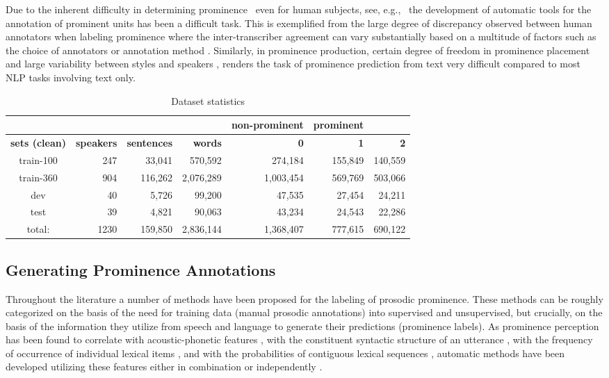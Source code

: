 \documentclass[11pt]{article}
\begin{document}
Due to the inherent difficulty in determining prominence \textemdash ~even for human subjects, see, e.g., \cite{yoon2004intertranscriber} \textemdash ~the development of automatic tools for the annotation of prominent units has been a difficult task. This is exemplified from the large degree of discrepancy observed between human annotators when labeling prominence where the inter-transcriber agreement can vary substantially based on a multitude of factors such as the choice of annotators or annotation method \cite{mo2008naive,yoon2004intertranscriber,kakouros20163pro}.
Similarly, in prominence production, certain degree of freedom in prominence placement and large variability between styles and speakers \cite{yuan2005pitch}, renders the task of prominence prediction from text very difficult compared to most NLP tasks involving text only.

\begin{table*}[ht!]
    \centering
\noindent\begin{tabular}{c|rrr|r|rr}\hline
& & & & \bf non-prominent & \bf prominent &\\
\hline
\bf sets (clean) & \bf speakers & \bf sentences & \bf words & \bf 0  & \bf 1 & \bf 2 \\
\hline
train-100 & 247 &  33,041 & 570,592 & 274,184 & 155,849 & 140,559 \\
train-360 & 904 & 116,262 & 2,076,289 & 1,003,454  & 569,769 & 503,066  \\
dev & 40 & 5,726 & 99,200 & 47,535 & 27,454 & 24,211 \\
test & 39 & 4,821 & 90,063 & 43,234 & 24,543 & 22,286 \\
\hline
total: & 1230 & 159,850 & 2,836,144 & 1,368,407 & 777,615 &  690,122     \\
\hline
\end{tabular}
\caption{Dataset statistics}
    \label{tab:dataset}
\end{table*}

\subsection{Generating Prominence Annotations}
Throughout the literature a number of methods have been proposed for the labeling of prosodic prominence. These methods can be roughly categorized on the basis of the need for training data (manual prosodic annotations) into supervised and unsupervised, but crucially, on the basis of the information they utilize from speech and language to generate their predictions (prominence labels). As prominence perception has been found to correlate with acoustic-phonetic features \cite{lieberman1960some}, with the constituent syntactic structure of an utterance \cite{gregory2004using,wagner2010experimental,bresnan1973sentence}, with the frequency of occurrence of individual lexical items \cite{nenkova2007memorize,jurafsky2001probabilistic}, and with the probabilities of contiguous lexical sequences \cite{jurafsky1996probabilistic}, automatic methods have been developed utilizing these features either in combination or independently \cite{nenkova2007memorize,kakouros2016analyzing,ostendorf1995boston,levow2008automatic}. 
\end{document}

